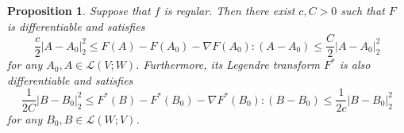 \documentclass[a4paper]{article}
\newcommand{\Lin}{\mathcal{L}}
\newtheorem{proposition}[theorem]{Proposition}
\theoremstyle{definition}
\theoremstyle{remark}
\begin{document}
\begin{proposition} \label{prp:regular}
Suppose that $f$ is regular. Then there exist $c, C > 0$ such that $F$ is differentiable and satisfies
\begin{equation} \label{eq:Hessian-estimate-F}
\frac{c}{2} |A - A_0|_2^2 \le F(A) - F(A_0) - \nabla F(A_0) : (A - A_0) \le \frac{C}{2} |A - A_0|_2^2
\end{equation}
for any $A_0, A \in \Lin(V; W)$. Furthermore, its Legendre transform $F^*$ is also differentiable and satisfies
\begin{equation} \label{eq:Hessian-estimate-F*}
\frac{1}{2C} |B - B_0|_2^2 \le F^*(B) - F^*(B_0) - \nabla F^*(B_0) : (B - B_0) \le \frac{1}{2c} |B - B_0|_2^2
\end{equation}
for any $B_0, B \in \Lin(W; V)$.
\end{proposition}
\end{document}
